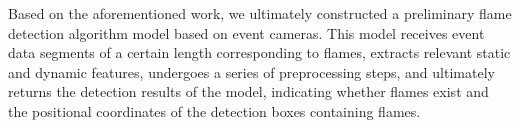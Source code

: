 \begin{abstract*}
  Based on the aforementioned work, we ultimately constructed a preliminary flame detection algorithm model based 
  on event cameras. This model receives event data segments of a certain length corresponding to flames, extracts 
  relevant static and dynamic features, undergoes a series of preprocessing steps, and ultimately returns the detection 
  results of the model, indicating whether flames exist and the positional coordinates of the detection boxes containing 
  flames.
\end{abstract*}
